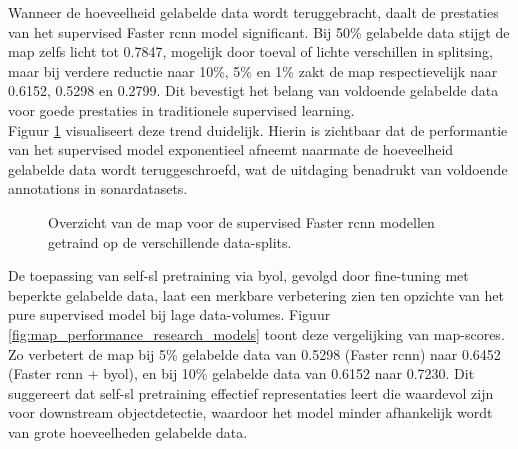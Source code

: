 Wanneer de hoeveelheid gelabelde data wordt teruggebracht, daalt de prestaties van het supervised Faster \gls{rcnn} model significant. Bij 50\% gelabelde data stijgt de \gls{map} zelfs licht tot 0.7847, mogelijk door toeval of lichte verschillen in splitsing, maar bij verdere reductie naar 10\%, 5\% en 1\% zakt de \gls{map} respectievelijk naar 0.6152, 0.5298 en 0.2799. Dit bevestigt het belang van voldoende gelabelde data voor goede prestaties in traditionele supervised learning. \\

Figuur \ref{fig:map_different_splits} visualiseert deze trend duidelijk. Hierin is zichtbaar dat de performantie van het supervised model exponentieel afneemt naarmate de hoeveelheid gelabelde data wordt teruggeschroefd, wat de uitdaging benadrukt van voldoende annotations in sonardatasets.

\begin{figure}[H]
    \centering
    \caption[mAP voor Faster R-CNN met verschillende data-splits.]{\label{fig:map_different_splits}Overzicht van de \gls{map} voor de supervised Faster \gls{rcnn} modellen getraind op de verschillende data-splits.}
\end{figure}

De toepassing van \gls{self-sl} pretraining via \gls{byol}, gevolgd door fine-tuning met beperkte gelabelde data, laat een merkbare verbetering zien ten opzichte van het pure supervised model bij lage data-volumes. Figuur \ref{fig:map_performance_research_models} toont deze vergelijking van \gls{map}-scores. Zo verbetert de \gls{map} bij 5\% gelabelde data van 0.5298 (Faster \gls{rcnn}) naar 0.6452 (Faster \gls{rcnn} + \gls{byol}), en bij 10\% gelabelde data van 0.6152 naar 0.7230. Dit suggereert dat \gls{self-sl} pretraining effectief representaties leert die waardevol zijn voor downstream objectdetectie, waardoor het model minder afhankelijk wordt van grote hoeveelheden gelabelde data. \\

